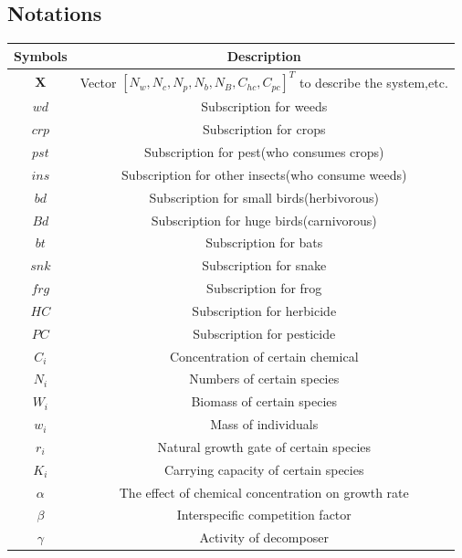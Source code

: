 \documentclass{HZNUMCM}
\begin{document}
        \subsection{Notations}
      \begin{table}[H]
        \centering
        \begin{tabular}{cc}
          \toprule
          \rowcolor{customcolor!40} %
          Symbols & Description\\
          \midrule
          $\mathbf{X}$ & Vector $[N_w,N_c,N_p,N_b,N_B,C_{hc},C_{pc}]^T$ to describe the system,etc. \\
          $wd$ & Subscription for weeds \\
          $crp$ & Subscription for crops \\
          $pst$ & Subscription for pest(who consumes crops) \\
          $ins$ & Subscription for other insects(who consume weeds) \\
          $bd$ & Subscription for small birds(herbivorous) \\
          $Bd$ & Subscription for huge birds(carnivorous) \\
          $bt$ & Subscription for bats \\
          $snk$ & Subscription for snake \\
          $frg$ & Subscription for frog \\
          $HC$ & Subscription for herbicide \\
          $PC$ & Subscription for pesticide \\
          $C_i$ & Concentration of certain chemical \\
          $N_i$ & Numbers of certain species \\
          $W_i$ & Biomass of certain species \\
          $w_i$ & Mass of individuals \\
          $r_i$ & Natural growth gate of certain species\\
          $K_i$ & Carrying capacity of certain species\\
          $\alpha$ & The effect of chemical concentration on growth rate\\
          $\beta$ & Interspecific competition factor\\
          $\gamma$ & Activity of decomposer\\
          
          \bottomrule
        \end{tabular}
        \label{tab:example}
      \end{table}
\end{document}
